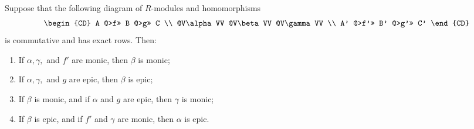 Suppose that the following diagram of $R$-modules and homomorphisms
$$\begin{CD}
A @>f>> B @>g>> C \\
@V\alpha VV @V\beta VV @V\gamma VV \\
A' @>f'>> B' @>g'>> C'
\end{CD}$$
is commutative and has exact rows. Then:
\begin{enumerate}
  \item[(1)] If $\alpha, \gamma,$ and $f'$ are monic, then $\beta$ is monic;
  \item[(2)] If $\alpha, \gamma,$ and $g$ are epic, then $\beta$ is epic;
  \item[(3)] If $\beta$ is monic, and if $\alpha$ and $g$ are epic, then $\gamma$ is monic;
  \item[(4)] If $\beta$ is epic, and if $f'$ and $\gamma$ are monic, then $\alpha$ is epic.
\end{enumerate}
